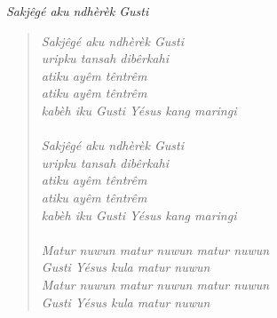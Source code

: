 \begin{center}
\itshape{Sakjêgé aku ndhèrèk Gusti}
\end{center}


\small
\begin{verse}
\itshape{
Sakjêgé aku ndhèrèk Gusti\\ 
uripku tansah dibêrkahi\\
atiku ayêm têntrêm\\ 
atiku ayêm têntrêm\\ 
kabèh iku Gusti Yésus kang maringi\\
{~}\\
Sakjêgé aku ndhèrèk Gusti\\ 
uripku tansah dibêrkahi\\
atiku ayêm têntrêm\\ 
atiku ayêm têntrêm\\ 
kabèh iku Gusti Yésus kang maringi\\
{~}\\
Matur nuwun matur nuwun matur nuwun \\
Gusti Yésus kula matur nuwun\\ 
Matur nuwun matur nuwun matur nuwun \\
Gusti Yésus kula matur nuwun\\ 
}
\end{verse}
\normalsize
